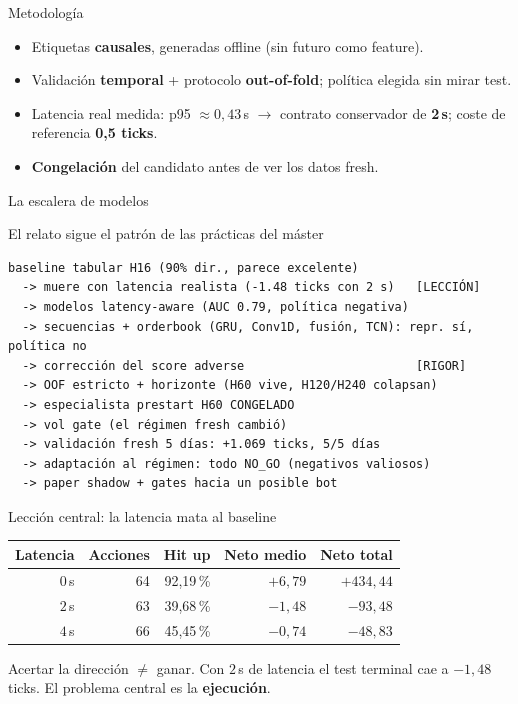 \documentclass[aspectratio=169,11pt]{beamer}
\begin{document}
\begin{frame}{Metodología}
  \begin{itemize}
    \item Etiquetas \textbf{causales}, generadas offline (sin futuro como feature).
    \item Validación \textbf{temporal} + protocolo \textbf{out-of-fold}; política
      elegida sin mirar test.
    \item Latencia real medida: p95 $\approx 0{,}43$\,s $\rightarrow$ contrato
      conservador de \textbf{2\,s}; coste de referencia \textbf{0,5 ticks}.
    \item \textbf{Congelación} del candidato antes de ver los datos fresh.
  \end{itemize}
\end{frame}

\begin{frame}[fragile]{La escalera de modelos}
  \scriptsize
  \begin{block}{El relato sigue el patrón de las prácticas del máster}
\begin{verbatim}
baseline tabular H16 (90% dir., parece excelente)
  -> muere con latencia realista (-1.48 ticks con 2 s)   [LECCIÓN]
  -> modelos latency-aware (AUC 0.79, política negativa)
  -> secuencias + orderbook (GRU, Conv1D, fusión, TCN): repr. sí, política no
  -> corrección del score adverse                        [RIGOR]
  -> OOF estricto + horizonte (H60 vive, H120/H240 colapsan)
  -> especialista prestart H60 CONGELADO
  -> vol gate (el régimen fresh cambió)
  -> validación fresh 5 días: +1.069 ticks, 5/5 días
  -> adaptación al régimen: todo NO_GO (negativos valiosos)
  -> paper shadow + gates hacia un posible bot
\end{verbatim}
  \end{block}
\end{frame}

\begin{frame}{Lección central: la latencia mata al baseline}
  \begin{table}
  \centering \small
  \begin{tabular}{rrrrr}
  \toprule
  Latencia & Acciones & Hit up & Neto medio & Neto total \\
  \midrule
  $0$\,s & 64 & 92,19\,\% & $+6{,}79$ & $+434{,}44$ \\
  $2$\,s & 63 & 39,68\,\% & $-1{,}48$ & $-93{,}48$ \\
  $4$\,s & 66 & 45,45\,\% & $-0{,}74$ & $-48{,}83$ \\
  \bottomrule
  \end{tabular}
  \end{table}
  \begin{block}{}
    Acertar la dirección $\neq$ ganar. Con $2$\,s de latencia el test terminal
    cae a $-1{,}48$ ticks. El problema central es la \textbf{ejecución}.
  \end{block}
\end{frame}
\end{document}
